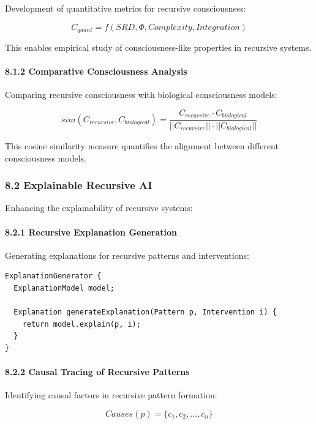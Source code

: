 \documentclass[
]{article}
\begin{document}
Development of quantitative metrics for recursive consciousness:

\[C_{quant} = f(SRD, \Phi, Complexity, Integration)\]

This enables empirical study of consciousness-like properties in
recursive systems.

\paragraph{8.1.2 Comparative Consciousness
Analysis}\label{comparative-consciousness-analysis}

Comparing recursive consciousness with biological consciousness models:

\[sim(C_{recursive}, C_{biological}) = \frac{C_{recursive} \cdot C_{biological}}{||C_{recursive}|| \cdot ||C_{biological}||}\]

This cosine similarity measure quantifies the alignment between
different consciousness models.

\subsubsection{8.2 Explainable Recursive
AI}\label{explainable-recursive-ai}

Enhancing the explainability of recursive systems:

\paragraph{8.2.1 Recursive Explanation
Generation}\label{recursive-explanation-generation}

Generating explanations for recursive patterns and interventions:

\begin{verbatim}
ExplanationGenerator {
  ExplanationModel model;
  
  Explanation generateExplanation(Pattern p, Intervention i) {
    return model.explain(p, i);
  }
}
\end{verbatim}

\paragraph{8.2.2 Causal Tracing of Recursive
Patterns}\label{causal-tracing-of-recursive-patterns}

Identifying causal factors in recursive pattern formation:

\[Causes(p) = \{c_1, c_2, ..., c_n\}\]
\end{document}

